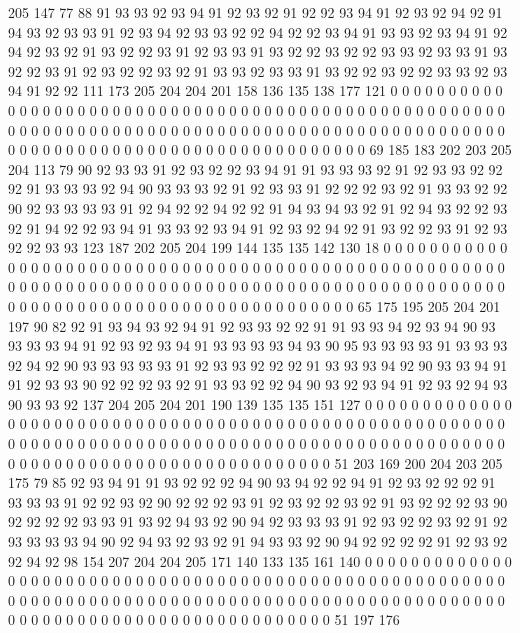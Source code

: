 205 147 77 88 91 93 93 92 93 94 91 92 93 92 91 92 92 93 94 91
92 93 92 94 92 91 94 93 92 93 93 91 92 93 94 92 93 93 92 92
94 92 92 93 94 91 93 93 92 93 94 91 92 94 92 93 92 91 93 92
92 93 91 92 93 93 91 93 92 92 93 92 92 93 93 92 93 93 91 93
92 92 93 91 92 93 92 92 93 92 91 93 93 92 93 93 91 93 92 92
93 92 92 93 93 92 93 94 91 92 92 111 173 205 204 204 201 158 136 135
138 177 121 0 0 0 0 0 0 0 0 0 0 0 0 0 0 0 0 0
0 0 0 0 0 0 0 0 0 0 0 0 0 0 0 0 0 0 0 0
0 0 0 0 0 0 0 0 0 0 0 0 0 0 0 0 0 0 0 0
0 0 0 0 0 0 0 0 0 0 0 0 0 0 0 0 0 0 0 0
0 0 0 0 0 0 0 0 0 0 0 0 0 0 0 0 0 0 0 0
0 0 0 0 0 0 0 0 0 0 0 0 0 0 0 0 0 0 0 0
0 0 0 0 0 0 0 0 0 0 69 185 183 202 203 205 204 113 79 90
92 93 93 91 92 93 92 92 93 94 91 91 93 93 93 92 91 92 93 93
92 92 92 91 93 93 93 92 94 90 93 93 93 92 91 92 93 93 91 92
92 92 93 92 91 93 93 92 92 90 92 93 93 93 93 91 92 94 92 92
94 92 92 91 94 93 94 93 92 91 92 94 93 92 92 93 92 91 94 92
92 93 94 91 93 93 92 93 94 91 92 93 92 94 92 91 93 92 92 93
91 92 93 92 92 93 93 123 187 202 205 204 199 144 135 135 142 130 18 0
0 0 0 0 0 0 0 0 0 0 0 0 0 0 0 0 0 0 0 0
0 0 0 0 0 0 0 0 0 0 0 0 0 0 0 0 0 0 0 0
0 0 0 0 0 0 0 0 0 0 0 0 0 0 0 0 0 0 0 0
0 0 0 0 0 0 0 0 0 0 0 0 0 0 0 0 0 0 0 0
0 0 0 0 0 0 0 0 0 0 0 0 0 0 0 0 0 0 0 0
0 0 0 0 0 0 0 0 0 0 0 0 0 0 0 0 0 0 0 0
0 0 0 0 0 0 65 175 195 205 204 201 197 90 82 92 91 93 94 93
92 94 91 92 93 93 92 92 91 91 93 93 94 92 93 94 90 93 93 93
93 94 91 92 93 92 93 94 91 93 93 93 93 94 93 90 95 93 93 93
93 91 93 93 93 92 94 92 90 93 93 93 93 93 91 92 93 93 92 92
92 91 93 93 93 94 92 90 93 93 94 91 91 92 93 93 90 92 92 92
93 92 91 93 93 92 92 94 90 93 92 93 94 91 92 93 92 94 93 90
93 93 92 137 204 205 204 201 190 139 135 135 151 127 0 0 0 0 0 0
0 0 0 0 0 0 0 0 0 0 0 0 0 0 0 0 0 0 0 0
0 0 0 0 0 0 0 0 0 0 0 0 0 0 0 0 0 0 0 0
0 0 0 0 0 0 0 0 0 0 0 0 0 0 0 0 0 0 0 0
0 0 0 0 0 0 0 0 0 0 0 0 0 0 0 0 0 0 0 0
0 0 0 0 0 0 0 0 0 0 0 0 0 0 0 0 0 0 0 0
0 0 0 0 0 0 0 0 0 0 0 0 0 0 0 0 0 0 0 0
0 51 203 169 200 204 203 205 175 79 85 92 93 94 91 91 93 92 92 92
94 90 93 94 92 92 94 91 92 93 92 92 92 91 93 93 93 91 92 92
93 92 90 92 92 92 93 91 92 93 92 92 93 92 91 93 92 92 92 93
90 92 92 92 92 93 93 91 93 92 94 93 92 90 94 92 93 93 93 91
92 93 92 92 93 92 91 92 93 93 93 93 94 90 92 94 93 92 93 92
91 94 93 93 92 90 94 92 92 92 92 91 92 93 92 92 94 92 98 154
207 204 204 205 171 140 133 135 161 140 0 0 0 0 0 0 0 0 0 0
0 0 0 0 0 0 0 0 0 0 0 0 0 0 0 0 0 0 0 0
0 0 0 0 0 0 0 0 0 0 0 0 0 0 0 0 0 0 0 0
0 0 0 0 0 0 0 0 0 0 0 0 0 0 0 0 0 0 0 0
0 0 0 0 0 0 0 0 0 0 0 0 0 0 0 0 0 0 0 0
0 0 0 0 0 0 0 0 0 0 0 0 0 0 0 0 0 0 0 0
0 0 0 0 0 0 0 0 0 0 0 0 0 0 0 0 0 51 197 176
